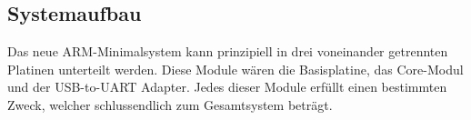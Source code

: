 \subsection{Systemaufbau}
\label{sec:systemaufbau}

Das neue \gls{ARM}-\gls{Minimalsystem} kann prinzipiell in drei voneinander getrennten Platinen unterteilt werden. Diese Module wären die \gls{Basisplatine}, das \gls{Core-Modul} und der \gls{USB-to-UART} Adapter. Jedes dieser Module erfüllt einen bestimmten Zweck, welcher schlussendlich zum Gesamtsystem beträgt.

